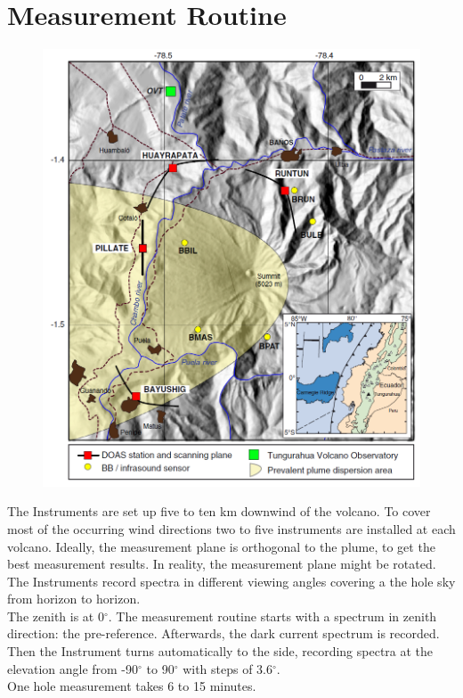 		
		\section{Measurement Routine}
		\begin{figure}[h]
			\centering
			\includegraphics[width=0.6\linewidth]{Bilder/Simon/Bilder_Tung/Map_Tungurahua2}
			\caption{}
			\label{fig:maptungurahua2}
		\end{figure}
		The Instruments are set up five to ten km downwind of the volcano. To cover most of the occurring wind directions two to five instruments are installed at each volcano. Ideally, the measurement plane is orthogonal to the plume, to get the best measurement results. In reality, the measurement plane might be rotated.\\
		The Instruments record spectra in different viewing angles covering a the hole sky from horizon to horizon.\\
		The zenith is at 0$^{\circ}$.
		The measurement routine starts with a spectrum in zenith direction: the pre-reference.
		Afterwards, the dark current spectrum is recorded.\\
		Then the Instrument turns automatically to the side, recording spectra at the elevation angle from -90$^{\circ}$ to 90$^{\circ}$ with steps of 3.6$^{\circ}$. \\
		One hole measurement takes 6 to 15 minutes.